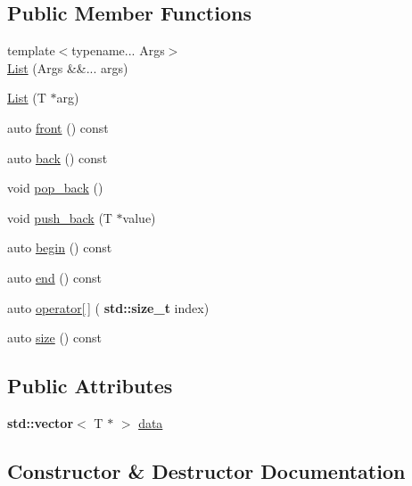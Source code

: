 \subsection*{Public Member Functions}
\begin{DoxyCompactItemize}
\item 
{\footnotesize template$<$typename... Args$>$ }\\\hyperlink{struct_list_a622a2ade2682950b9346ac692b17039c}{List} (Args \&\&... args)
\item 
\hyperlink{struct_list_ac1fba3a80d1d7fffbd2c1853a624f40a}{List} (T $\ast$arg)
\item 
auto \hyperlink{struct_list_a4efaea597a8cea09cc9e7717e6a9f80a}{front} () const
\item 
auto \hyperlink{struct_list_a6949268f152305afc5bac0ee3e5bb838}{back} () const
\item 
void \hyperlink{struct_list_a42e1aee3e26b76b3f4d9386efa7fe8b7}{pop\+\_\+back} ()
\item 
void \hyperlink{struct_list_af4ca3dd63fcff83845b673dfd7d5d715}{push\+\_\+back} (T $\ast$value)
\item 
auto \hyperlink{struct_list_afa6f9828eab89e2fcae63b612927fabb}{begin} () const
\item 
auto \hyperlink{struct_list_a22f91e0dfc7ab053952fc8ed33e5cd53}{end} () const
\item 
auto \hyperlink{struct_list_a40b4d77cbee9b7c311c304cafbf07d1e}{operator\mbox{[}$\,$\mbox{]}} (\textbf{ std\+::size\+\_\+t} index)
\item 
auto \hyperlink{struct_list_acd4b77162f54d7e3b5b3a16ffad80d40}{size} () const
\end{DoxyCompactItemize}
\subsection*{Public Attributes}
\begin{DoxyCompactItemize}
\item 
\textbf{ std\+::vector}$<$ T $\ast$ $>$ \hyperlink{struct_list_a63c9cd234577800ed4664dcefebba10e}{data}
\end{DoxyCompactItemize}


\subsection{Constructor \& Destructor Documentation}
\mbox{\label{struct_list_a622a2ade2682950b9346ac692b17039c}} 
